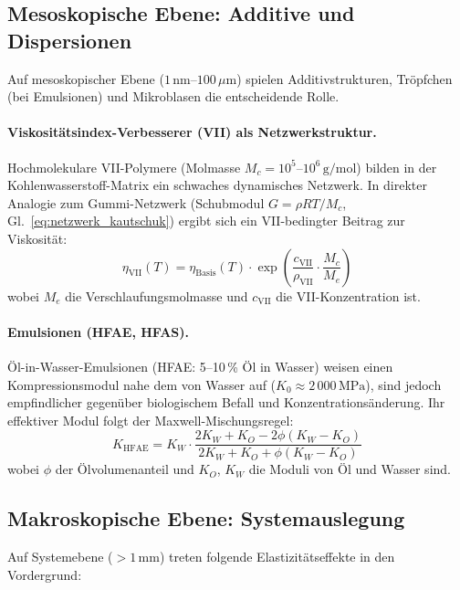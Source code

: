 ﻿\documentclass[a4paper,12pt]{scrreprt}
\theoremstyle{definition}
\begin{document}
\subsection{Mesoskopische Ebene: Additive und Dispersionen}

Auf mesoskopischer Ebene ($1\,\mathrm{nm}$--$100\,\mu\mathrm{m}$) spielen
Additivstrukturen, Tröpfchen (bei Emulsionen) und Mikroblasen die
entscheidende Rolle.

\paragraph{Viskositätsindex-Verbesserer (VII) als Netzwerkstruktur.}
Hochmolekulare VII-Polymere (Molmasse $M_c = 10^5$--$10^6\,\mathrm{g/mol}$)
bilden in der Kohlenwasserstoff-Matrix ein schwaches dynamisches Netzwerk.
In direkter Analogie zum Gummi-Netzwerk (Schubmodul
$G = \rho R T / M_c$, Gl.~\eqref{eq:netzwerk_kautschuk}) ergibt sich
ein VII-bedingter Beitrag zur Viskosität:
\begin{equation}
  \eta_{\mathrm{VII}}(T) = \eta_{\mathrm{Basis}}(T)
    \cdot \exp\!\left(\frac{c_{\mathrm{VII}}}{\rho_{\mathrm{VII}}} \cdot \frac{M_c}{M_e}\right)
  \label{eq:eta_vii}
\end{equation}
wobei $M_e$ die Verschlaufungsmolmasse und $c_{\mathrm{VII}}$ die
VII-Konzentration ist.

\paragraph{Emulsionen (HFAE, HFAS).}
Öl-in-Wasser-Emulsionen (HFAE: 5--10\,\% Öl in Wasser) weisen einen
Kompressionsmodul nahe dem von Wasser auf ($K_0 \approx 2\,000\,\mathrm{MPa}$),
sind jedoch empfindlicher gegenüber biologischem Befall und Konzentrations\-änderung.
Ihr effektiver Modul folgt der Maxwell-Mischungsregel:
\begin{equation}
  K_{\mathrm{HFAE}} = K_W \cdot
    \frac{2K_W + K_O - 2\phi(K_W - K_O)}{2K_W + K_O + \phi(K_W - K_O)}
  \label{eq:maxwell_mischung}
\end{equation}
wobei $\phi$ der Ölvolumenanteil und $K_O$, $K_W$ die Moduli von Öl
und Wasser sind.

\subsection{Makroskopische Ebene: Systemauslegung}

Auf Systemebene ($> 1\,\mathrm{mm}$) treten folgende Elastizitätseffekte
in den Vordergrund:
\end{document}
